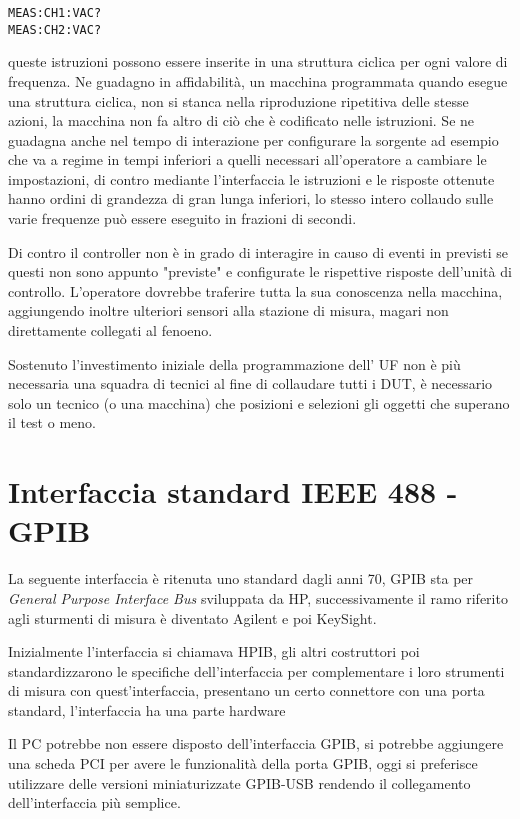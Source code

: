 \begin{verbatim}
MEAS:CH1:VAC?
MEAS:CH2:VAC?
\end{verbatim}

queste istruzioni possono essere inserite in una struttura ciclica per ogni
valore di frequenza.
Ne guadagno in affidabilità, un macchina programmata quando esegue una struttura
ciclica, non si
stanca nella riproduzione ripetitiva delle stesse azioni, la macchina non fa
altro di ciò che è
codificato nelle istruzioni.
Se ne guadagna anche nel tempo di interazione per configurare la sorgente ad
esempio che va a
regime in tempi inferiori a quelli necessari all'operatore a cambiare le
impostazioni, di
contro mediante l'interfaccia le istruzioni e le risposte ottenute hanno ordini
di grandezza di
gran lunga inferiori, lo stesso intero collaudo sulle varie frequenze può essere
eseguito in
frazioni di secondi.

Di contro il controller non è in grado di interagire in causo di eventi in
previsti se questi non
sono appunto "previste" e configurate le rispettive risposte dell'unità di
controllo.
L'operatore dovrebbe traferire tutta la sua conoscenza nella macchina,
aggiungendo inoltre
ulteriori sensori alla stazione di misura, magari non direttamente collegati al
fenoeno.

Sostenuto l'investimento iniziale della programmazione dell' UF non è più
necessaria una squadra di
tecnici al fine di collaudare tutti i DUT, è necessario solo un tecnico (o una
macchina) che
posizioni e selezioni gli oggetti che superano il test o meno.

\section{Interfaccia standard IEEE 488 - GPIB}
La seguente interfaccia è ritenuta uno standard dagli anni 70, GPIB sta per
\textit{General Purpose Interface Bus} sviluppata da HP, successivamente il
ramo riferito agli sturmenti di misura è diventato Agilent e poi KeySight.

Inizialmente l'interfaccia si chiamava HPIB, gli altri costruttori poi
standardizzarono le specifiche dell'interfaccia per complementare i loro
strumenti di misura con quest'interfaccia, presentano un certo connettore con
una porta standard, l'interfaccia ha una parte hardware

Il PC potrebbe non essere disposto dell'interfaccia GPIB, si potrebbe
aggiungere una scheda PCI per avere le funzionalità della porta GPIB, oggi si
preferisce utilizzare delle versioni miniaturizzate GPIB-USB rendendo il
collegamento dell'interfaccia più semplice.

